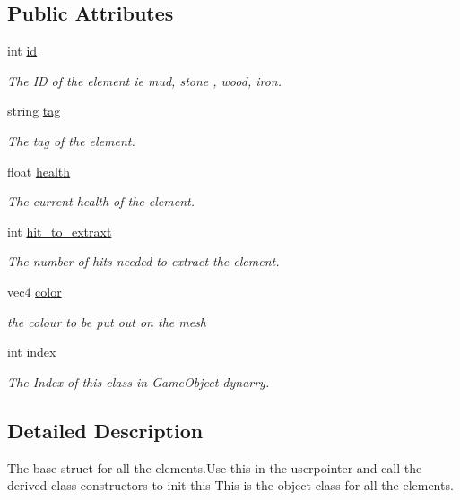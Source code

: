 \subsection*{Public Attributes}
\begin{DoxyCompactItemize}
\item 
int \hyperlink{structoctet_1_1_elements_ad7862925baea3ff467671233e86c6584}{id}
\begin{DoxyCompactList}\small\item\em The I\+D of the element ie mud, stone , wood, iron. \end{DoxyCompactList}\item 
string \hyperlink{structoctet_1_1_elements_ad7bb712671fd59dfce732441b15ed6e9}{tag}
\begin{DoxyCompactList}\small\item\em The tag of the element. \end{DoxyCompactList}\item 
float \hyperlink{structoctet_1_1_elements_af9cece89e171f07841b897dfb9be4eba}{health}
\begin{DoxyCompactList}\small\item\em The current health of the element. \end{DoxyCompactList}\item 
int \hyperlink{structoctet_1_1_elements_a33a93377f7814a339d0b4bc0d8200c02}{hit\+\_\+to\+\_\+extraxt}
\begin{DoxyCompactList}\small\item\em The number of hits needed to extract the element. \end{DoxyCompactList}\item 
vec4 \hyperlink{structoctet_1_1_elements_adf503621aeb69c7112453a430e39f76e}{color}
\begin{DoxyCompactList}\small\item\em the colour to be put out on the mesh \end{DoxyCompactList}\item 
int \hyperlink{structoctet_1_1_elements_a8d2c5872a3c685832f767505c85cf7e3}{index}
\begin{DoxyCompactList}\small\item\em The Index of this class in Game\+Object dynarry. \end{DoxyCompactList}\end{DoxyCompactItemize}


\subsection{Detailed Description}
The base struct for all the elements.\+Use this in the userpointer and call the derived class constructors to init this This is the object class for all the elements. 

